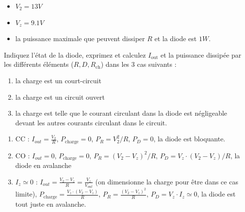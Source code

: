 \documentclass{../template/labo}
\begin{document}
\begin{itemize}
\item $V_2 = 13V$
\item $V_z = 9.1V$
\item la puissance maximale que peuvent dissiper $R$ et la diode est $1W$.
\end{itemize}
\Question
{
	Indiquez l'état de la diode, exprimez et calculez $I_{\mbox{out}}$ et la puissance dissipée par les différents éléments ($R, D, R_{\mbox{ch}}$) dans les 3 cas suivants :
	\begin{enumerate}
	\item la charge est un court-circuit
	\item la charge est un circuit ouvert
	\item la charge est telle que le courant circulant dans la diode est négligeable devant les autres courants circulant dans le circuit.
	\end{enumerate}
}
{
	\begin{enumerate}
		\item CC : $I_{out} = \frac{V_2}{R}$, $P_{\mbox{charge}}=0$, $P_R=V_2^2/R$, $P_D=0$, la diode est bloquante.
		\item CO : $I_{out} = 0$, $P_{\mbox{charge}}=0$, $P_R=\left(V_2-V_z\right)^2/R$, $P_D=V_z\cdot \left(V_2-V_z\right)/R$, la diode en avalanche
		\item $I_z\simeq 0$ : $I_{out} = \frac{V_2 - V_z}{R} = \frac{V_z}{V_{out}}$ (on dimensionne la charge pour être dans ce cas limite), $P_{\mbox{charge}}=\frac{V_z\cdot \left(V_2-V_z\right)}{R}$, $P_R=\frac{\left(V_2-V_z\right)^2}{R}$, $P_D = V_z \cdot I_z \simeq 0$, la diode est tout juste en avalanche.
		\end{enumerate}	
	}%
	\label{Q:22}
\end{document}
